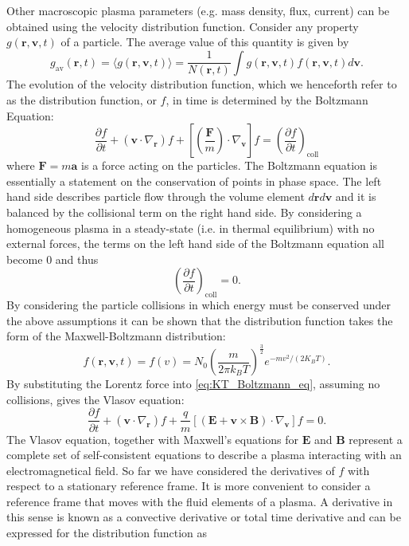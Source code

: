 Other macroscopic plasma parameters (e.g. mass density, flux, current) can be obtained using the velocity distribution function. Consider any property $g(\mathbf{r},\mathbf{v}, t)$ of a particle. The average value of this quantity is given by
\begin{equation}
\label{eq:KT_average_value}
g_{\mbox{av}}(\mathbf{r}, t)  = \langle g(\mathbf{r}, \mathbf{v}, t) \rangle = \frac{1}{N(\mathbf{r}, t)} \int g(\mathbf{r}, \mathbf{v}, t) f(\mathbf{r}, \mathbf{v}, t) d\mathbf{v}.
\end{equation}
The evolution of the velocity distribution function, which we henceforth refer to as the distribution function, or $f$, in time is determined by the Boltzmann Equation:
\begin{equation}
\label{eq:KT_Boltzmann_eq}
\frac{\partial f}{\partial t} + (\mathbf{v} \cdot \nabla_\mathbf{r})f + \left[ \left(\frac{\mathbf{F}}{m} \right) \cdot \nabla_\mathbf{v}\right]f = \left( \frac{\partial f}{\partial t} \right)_{\mbox{coll}}
\end{equation}
where $\mathbf{F} =m\mathbf{a}$ is a force acting on the particles.
The Boltzmann equation is essentially a statement on the conservation of points in phase space. The left hand side describes particle flow through the volume element $d\mathbf{r} d\mathbf{v}$ and it is balanced by the collisional term on the right hand side. By considering a homogeneous plasma in a steady-state (i.e. in thermal equilibrium) with no external forces, the terms on the left hand side of the Boltzmann equation all become 0 and thus 
$$
\left( \frac{\partial f}{\partial t} \right)_{\mbox{coll}} = 0.
$$
By considering the particle collisions in which energy must be conserved under the above assumptions it can be shown that the distribution function takes the form of the Maxwell-Boltzmann distribution:
\begin{equation}
\label{eq:KT_maxwellboltzmann}
f(\mathbf{r}, \mathbf{v}, t) = f(v) = N_0 \left( \frac{m}{2 \pi k_B T} \right)^{\frac{3}{2}} e^{-mv^2/(2K_BT)}.
\end{equation}
By substituting the Lorentz force into \ref{eq:KT_Boltzmann_eq}, assuming no collisions, gives the Vlasov equation:
\begin{equation}
\label{eq:KT_Vlasov_eq}
\frac{\partial f}{\partial t} + (\mathbf{v} \cdot \nabla_\mathbf{r})f + \frac{q}{m} \left[ \left(\mathbf{E} + \mathbf{v} \times \mathbf{B} \right) \cdot \nabla_\mathbf{v}\right]f = 0. 
\end{equation}
The Vlasov equation, together with Maxwell's equations for $\mathbf{E}$ and $\mathbf{B}$ represent a complete set of self-consistent equations to describe a plasma interacting with an electromagnetical field. So far we have considered the derivatives of $f$ with respect to a stationary reference frame. It is more convenient to consider a reference frame that moves with the fluid elements of a plasma. A derivative in this sense is known as a convective derivative or total time derivative and can be expressed for the distribution function as
